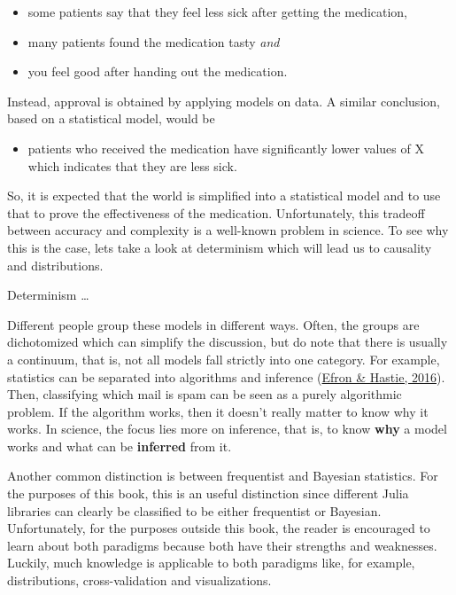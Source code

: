 \documentclass[
  14pt
  american,
  paper=a4,
  ,captions=tableheading
]{scrbook}
\providecommand{\tightlist}{%
  \setlength{\itemsep}{0pt}\setlength{\parskip}{0pt}}
\begin{document}
\begin{itemize}
\tightlist
\item
  some patients say that they feel less sick after getting the
  medication,
\item
  many patients found the medication tasty \emph{and}
\item
  you feel good after handing out the medication.
\end{itemize}

Instead, approval is obtained by applying models on data. A similar
conclusion, based on a statistical model, would be

\begin{itemize}
\tightlist
\item
  patients who received the medication have significantly lower values
  of X which indicates that they are less sick.
\end{itemize}

So, it is expected that the world is simplified into a statistical model
and to use that to prove the effectiveness of the medication.
Unfortunately, this tradeoff between accuracy and complexity is a
well-known problem in science. To see why this is the case, lets take a
look at determinism which will lead us to causality and distributions.

Determinism \ldots{}

Different people group these models in different ways. Often, the groups
are dichotomized which can simplify the discussion, but do note that
there is usually a continuum, that is, not all models fall strictly into
one category. For example, statistics can be separated into algorithms
and inference (\protect\hyperlink{ref-efron2016computer}{Efron \&
Hastie, 2016}). Then, classifying which mail is spam can be seen as a
purely algorithmic problem. If the algorithm works, then it doesn't
really matter to know why it works. In science, the focus lies more on
inference, that is, to know \textbf{why} a model works and what can be
\textbf{inferred} from it.

Another common distinction is between frequentist and Bayesian
statistics. For the purposes of this book, this is an useful distinction
since different Julia libraries can clearly be classified to be either
frequentist or Bayesian. Unfortunately, for the purposes outside this
book, the reader is encouraged to learn about both paradigms because
both have their strengths and weaknesses. Luckily, much knowledge is
applicable to both paradigms like, for example, distributions,
cross-validation and visualizations.
\end{document}
